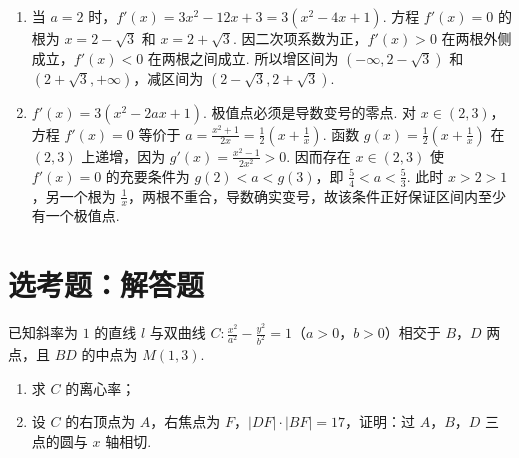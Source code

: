 \begin{solution}
\begin{enumerate}
\item 当 \(a=2\) 时，\(f'(x)=3x^2-12x+3=3\left(x^2-4x+1\right)\). 方程 \(f'(x)=0\) 的根为 \(x=2-\sqrt{3}\) 和 \(x=2+\sqrt{3}\). 因二次项系数为正，\(f'(x)>0\) 在两根外侧成立，\(f'(x)<0\) 在两根之间成立. 所以增区间为 \(\left(-\infty,2-\sqrt{3}\right)\) 和 \(\left(2+\sqrt{3},+\infty\right)\)，减区间为 \(\left(2-\sqrt{3},2+\sqrt{3}\right)\).
\item \(f'(x)=3\left(x^2-2ax+1\right)\). 极值点必须是导数变号的零点. 对 \(x\in(2,3)\)，方程 \(f'(x)=0\) 等价于 \(a=\frac{x^2+1}{2x}=\frac{1}{2}\left(x+\frac{1}{x}\right)\). 函数 \(g(x)=\frac{1}{2}\left(x+\frac{1}{x}\right)\) 在 \((2,3)\) 上递增，因为 \(g'(x)=\frac{x^2-1}{2x^2}>0\). 因而存在 \(x\in(2,3)\) 使 \(f'(x)=0\) 的充要条件为 \(g(2)<a<g(3)\)，即 \(\frac{5}{4}<a<\frac{5}{3}\). 此时 \(x>2>1\)，另一个根为 \(\frac{1}{x}\)，两根不重合，导数确实变号，故该条件正好保证区间内至少有一个极值点.
\end{enumerate}
\end{solution}

\section{选考题：解答题}

\begin{problem}
已知斜率为 \(1\) 的直线 \(l\) 与双曲线 \(C: \frac{x^{2}}{a^{2}} - \frac{y^{2}}{b^{2}} = 1\)（\(a > 0\)，\(b > 0\)）相交于 \(B\)，\(D\) 两点，且 \(BD\) 的中点为 \(M(1,3)\).

\begin{enumerate}
\item 求 \(C\) 的离心率；
\item 设 \(C\) 的右顶点为 \(A\)，右焦点为 \(F\)，\(\left|DF\right| \cdot \left|BF\right| = 17\)，证明：过 \(A\)，\(B\)，\(D\) 三点的圆与 \(x\) 轴相切.
\end{enumerate}
\end{problem}

